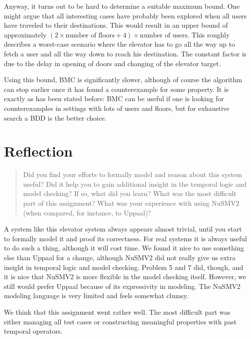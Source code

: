 \documentclass[a4paper,10pt]{article}
\begin{document}
	Anyway, it turns out to be hard to determine a suitable maximum bound. One might argue that all interesting cases have probably been explored when all users have traveled to their destinations. This would result in an upper bound of approximately \((2 \times \textrm{number of floors} + 4) \times \textrm{number of users}\). This roughly describes a worst-case scenario where the elevator has to go all the way up to fetch a user and all the way down to reach his destination. The constant factor is due to the delay in opening of doors and changing of the elevator target.
	
	Using this bound, BMC is significantly slower, although of course the algorithm can stop earlier once it has found a counterexample for some property. It is exactly as has been stated before: BMC can be useful if one is looking for counterexamples in settings with lots of users and floors, but for exhaustive search a BDD is the better choice.
	
	\section{Reflection}

	\begin{quote}
	Did you find your efforts to formally model and reason about this system useful? Did it help you to gain additional insight in the temporal logic and model checking? If so, what did you learn? What was the most difficult part of this assignment? What was your experience with using NuSMV2 (when compared, for instance, to Uppaal)?
	\end{quote}

	A system like this elevator system always appears almost trivial, until you start to formally model it and proof its correctness. For real systems it is always useful to do such a thing, although it will cost time. We found it nice to use something else than Uppaal for a change, although NuSMV2 did not really give us extra insight in temporal logic and model checking. Problem 5 and 7 did, though, and it is nice that NuSMV2 is more flexible in the model checking itself. However, we still would prefer Uppaal because of its expressivity in modeling. The NuSMV2 modeling language is very limited and feels somewhat clumsy.

	We think that this assignment went rather well. The most difficult part was either managing all test cases or constructing meaningful properties with past temporal operators.
\end{document}
